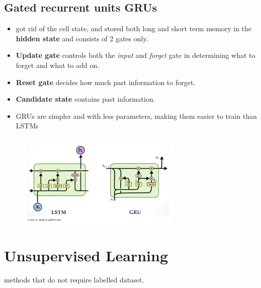 \documentclass[a4paper,10pt]{article}
\begin{document}
\subsection{Gated recurrent units GRUs}
\begin{itemize}
    \item got rid of the cell state, and stored both long and short term memory in the \textbf{hidden state} and consists of 2 gates only.
    \item \textbf{Update gate} controls both the \textit{input} and \textit{forget} gate in determining what to forget and what to add on. 
    \item \textbf{Reset gate} decides how much past information to forget. 
    \item \textbf{Candidate state} contains past information.
    \item GRUs are simpler and with less parameters, making them easier to train than LSTMs
\end{itemize}

\vspace*{-0.3cm}
\begin{figure}[ht]
    \centering
    \includegraphics[width =0.7\textwidth]{LSTM_GRU.png}
\end{figure}


\section{Unsupervised Learning}
methods that do not require labelled dataset. 

\end{document}
